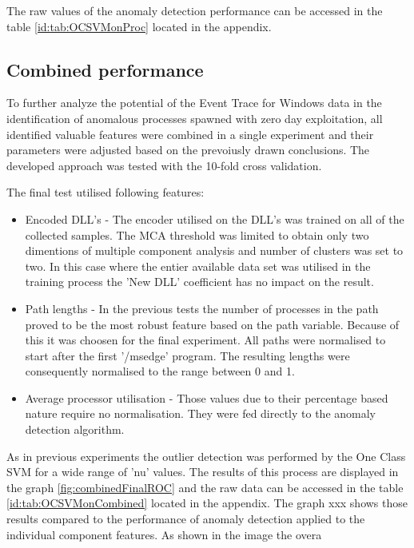\documentclass[a4paper,twoside,12pt]{book}
\begin{document}
The raw values of the anomaly detection performance can be accessed in the table \ref{id:tab:OCSVMonProc} located in the 
appendix. 

\subsection{Combined performance}

To further analyze the potential of the Event Trace for Windows data in the identification of
anomalous processes spawned with zero day exploitation, all identified valuable features were
combined in a single experiment and their parameters were adjusted based on the prevoiusly drawn 
conclusions. The developed approach was tested with the 10-fold cross validation.

The final test utilised following features:
\begin{itemize}
	\item Encoded DLL's - The encoder utilised on the DLL's was trained on all of the collected samples. The MCA 
	threshold was limited to obtain only two dimentions of multiple component analysis and number of clusters was set 
	to two. In this case where the entier available data set was utilised in the training process the 'New DLL'
	coefficient has no impact on the result.  
	\item Path lengths - In the previous tests the number of processes in the path proved to be the most robust feature
	based on the path variable. Because of this it was choosen for the final experiment. All paths were normalised to start
	after the first '/msedge' program. The resulting lengths were consequently normalised to the range between 0 and 1.
	\item Average processor utilisation - Those values due to their percentage based nature require no normalisation. They 
	were fed directly to the anomaly detection algorithm. 
\end{itemize}

As in previous experiments the outlier detection was performed by the One Class SVM for a wide range of 'nu' values. The results of 
this process are displayed in the graph \ref{fig:combinedFinalROC} and the raw data can be accessed in the table 
\ref{id:tab:OCSVMonCombined} located in the appendix. The graph xxx shows those results compared to the performance
of anomaly detection applied to the individual component features. As shown in the image the overa 
\end{document}
